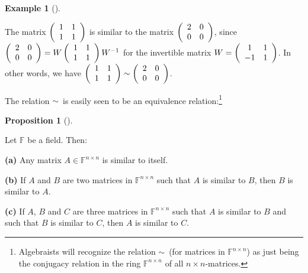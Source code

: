 \documentclass[numbers=enddot,12pt,final,onecolumn,notitlepage]{scrartcl}%
\numberwithin{exer}{subsection}
\theoremstyle{definition}
\newtheorem{prop}[theo]{Proposition}
\newenvironment{proposition}[1][]
{\begin{prop}[#1]\begin{leftbar}}
{\end{leftbar}\end{prop}}
\newtheorem{exam}[theo]{Example}
\newenvironment{example}[1][]
{\begin{exam}[#1]\begin{leftbar}}
{\end{leftbar}\end{exam}}
\begin{document}
\begin{example}
The matrix $\left(
\begin{array}
[c]{cc}%
1 & 1\\
1 & 1
\end{array}
\right)  $ is similar to the matrix $\left(
\begin{array}
[c]{cc}%
2 & 0\\
0 & 0
\end{array}
\right)  $, since $\left(
\begin{array}
[c]{cc}%
2 & 0\\
0 & 0
\end{array}
\right)  =W\left(
\begin{array}
[c]{cc}%
1 & 1\\
1 & 1
\end{array}
\right)  W^{-1}$ for the invertible matrix $W=\left(
\begin{array}
[c]{cc}%
1 & 1\\
-1 & 1
\end{array}
\right)  $. In other words, we have $\left(
\begin{array}
[c]{cc}%
1 & 1\\
1 & 1
\end{array}
\right)  \sim\left(
\begin{array}
[c]{cc}%
2 & 0\\
0 & 0
\end{array}
\right)  $.
\end{example}

The relation $\sim$\ is easily seen to be an equivalence
relation:\footnote{Algebraists will recognize the relation $\sim$\ (for
matrices in $\mathbb{F}^{n\times n}$) as just being the conjugacy relation in
the ring $\mathbb{F}^{n\times n}$ of all $n\times n$-matrices.}

\begin{proposition}
\label{prop.schurtri.similar.eqrel}Let $\mathbb{F}$ be a field. Then: \medskip

\textbf{(a)} Any matrix $A\in\mathbb{F}^{n\times n}$ is similar to itself.
\medskip

\textbf{(b)} If $A$ and $B$ are two matrices in $\mathbb{F}^{n\times n}$ such
that $A$ is similar to $B$, then $B$ is similar to $A$. \medskip

\textbf{(c)} If $A$, $B$ and $C$ are three matrices in $\mathbb{F}^{n\times
n}$ such that $A$ is similar to $B$ and such that $B$ is similar to $C$, then
$A$ is similar to $C$.
\end{proposition}
\end{document}
